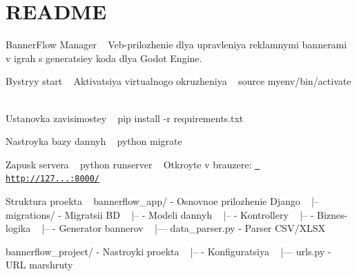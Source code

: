 \chapter{README}
\hypertarget{md_README}{}\label{md_README}
Banner\+Flow Manager ~\newline
 Veb-\/prilozhenie dlya upravleniya reklamnymi bannerami v igrah s generatsiey koda dlya Godot Engine. ~\newline


Bystryy start ~\newline
 Aktivatsiya virtualnogo okruzheniya ~\newline
 source myenv/bin/activate ~\newline


Ustanovka zavisimostey ~\newline
 pip install -\/r requirements.\+txt ~\newline


Nastroyka bazy dannyh ~\newline
 python  migrate ~\newline


Zapusk servera ~\newline
 python  runserver ~\newline
 Otkroyte v brauzere\+: \href{http://127.0.0.1:8000/}{\texttt{ http\+://127...\+:8000/}} ~\newline


Struktura proekta ~\newline
 bannerflow\+\_\+app/ -\/ Osnovnoe prilozhenie Django ~\newline
 |-- migrations/ -\/ Migratsii BD ~\newline
 |--  -\/ Modeli dannyh ~\newline
 |--  -\/ Kontrollery ~\newline
 |--  -\/ Biznes-\/logika ~\newline
 |--  -\/ Generator bannerov ~\newline
 |--- data\+\_\+parser.\+py -\/ Parser CSV/\+XLSX ~\newline


bannerflow\+\_\+project/ -\/ Nastroyki proekta ~\newline
 |--  -\/ Konfiguratsiya ~\newline
 |--- urls.\+py -\/ URL marshruty ~\newline


